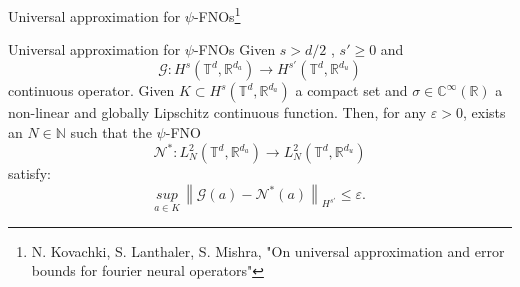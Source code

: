 \documentclass{beamer}
\newcommand{\numberset}{\mathbb}
\newcommand{\N}{\numberset{N}}
\newcommand{\R}{\numberset{R}}
\newcommand{\C}{\numberset{C}}
\begin{document}
\begin{frame}{Universal approximation for $\psi$-FNOs\footnote{N. Kovachki, S. Lanthaler, S. Mishra, "On universal approximation and error bounds for fourier neural operators"}}
	\begin{themedTitleBlock}{Universal approximation for $\psi$-FNOs} %
		Given $ s > d/2$ , $ s' \ge 0 $ and 
		\[ \mathcal{G}: H^s(\mathbb{T}^d, \R^{d_a}) \to H^{s'}(\mathbb{T}^d, \R^{d_u}) \]
		continuous operator. Given $ K \subset H^s(\mathbb{T}^d, \R^{d_a}) $ a compact set and $ \sigma \in \C^{\infty}(\R) $ a non-linear and globally Lipschitz continuous function. Then, for any $ \varepsilon > 0 $, exists an $ N \in \N $ such that the $ \psi $-FNO 
		\[ \mathcal{N}^{*}: L^2_N(\mathbb{T}^d, \R^{d_a}) \to L^2_N(\mathbb{T}^d, \R^{d_u}) \]
		satisfy:
		\[ \underset{a \in K}{sup}\, \left\| \mathcal{G}(a) - \mathcal{N}^{*}(a) \right\|_{H^{s'}} \le \varepsilon.  \]
	\end{themedTitleBlock}	
\end{frame}

\end{document}
